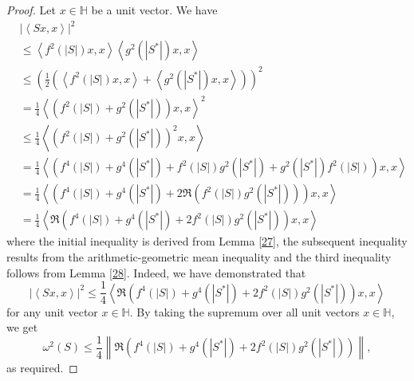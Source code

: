 \documentclass[12pt,twoside,reqno]{amsart}
\numberwithin{equation}{section}
\begin{document}
\begin{proof}
Let $x\in \mathbb H$ be a unit vector. We have
\[\begin{aligned}
  & {{\left| \left\langle Sx,x \right\rangle  \right|}^{2}} \\ 
 & \le \left\langle {{f}^{2}}\left( \left| S \right| \right)x,x \right\rangle \left\langle {{g}^{2}}\left( \left| {{S}^{*}} \right| \right)x,x \right\rangle  \\ 
 & \le {{\left( \frac{1}{2}\left( \left\langle {{f}^{2}}\left( \left| S \right| \right)x,x \right\rangle +\left\langle {{g}^{2}}\left( \left| {{S}^{*}} \right| \right)x,x \right\rangle  \right) \right)}^{2}} \\ 
 & =\frac{1}{4}{{\left\langle \left( {{f}^{2}}\left( \left| S \right| \right)+{{g}^{2}}\left( \left| {{S}^{*}} \right| \right) \right)x,x \right\rangle }^{2}} \\ 
 & \le \frac{1}{4}\left\langle {{\left( {{f}^{2}}\left( \left| S \right| \right)+{{g}^{2}}\left( \left| {{S}^{*}} \right| \right) \right)}^{2}}x,x \right\rangle  \\ 
 & =\frac{1}{4}\left\langle \left( {{f}^{4}}\left( \left| S \right| \right)+{{g}^{4}}\left( \left| {{S}^{*}} \right| \right)+{{f}^{2}}\left( \left| S \right| \right){{g}^{2}}\left( \left| {{S}^{*}} \right| \right)+{{g}^{2}}\left( \left| {{S}^{*}} \right| \right){{f}^{2}}\left( \left| S \right| \right) \right)x,x \right\rangle  \\ 
 & =\frac{1}{4}\left\langle \left( {{f}^{4}}\left( \left| S \right| \right)+{{g}^{4}}\left( \left| {{S}^{*}} \right| \right)+2\Re\left( {{f}^{2}}\left( \left| S \right| \right){{g}^{2}}\left( \left| {{S}^{*}} \right| \right) \right) \right)x,x \right\rangle  \\ 
 & =\frac{1}{4}\left\langle \Re\left( {{f}^{4}}\left( \left| S \right| \right)+{{g}^{4}}\left( \left| {{S}^{*}} \right| \right)+2{{f}^{2}}\left( \left| S \right| \right){{g}^{2}}\left( \left| {{S}^{*}} \right| \right) \right)x,x \right\rangle   
\end{aligned}\]
where the initial inequality is derived from Lemma \ref{27}, the subsequent inequality results from the arithmetic-geometric mean inequality and the third inequality follows from Lemma \ref{28}. Indeed, we have demonstrated that
\[{{\left| \left\langle Sx,x \right\rangle  \right|}^{2}}\le \frac{1}{4}\left\langle \Re\left( {{f}^{4}}\left( \left| S \right| \right)+{{g}^{4}}\left( \left| {{S}^{*}} \right| \right)+2{{f}^{2}}\left( \left| S \right| \right){{g}^{2}}\left( \left| {{S}^{*}} \right| \right) \right)x,x \right\rangle \]
for any unit vector $x\in \mathbb H$. By taking the supremum over all unit vectors $x\in \mathbb H$, we get
\[{{\omega }^{2}}\left( S \right)\le \frac{1}{4}\left\| \Re\left( {{f}^{4}}\left( \left| S \right| \right)+{{g}^{4}}\left( \left| {{S}^{*}} \right| \right)+2{{f}^{2}}\left( \left| S \right| \right){{g}^{2}}\left( \left| {{S}^{*}} \right| \right) \right) \right\|,\]
as required.
\end{proof}
\end{document}
